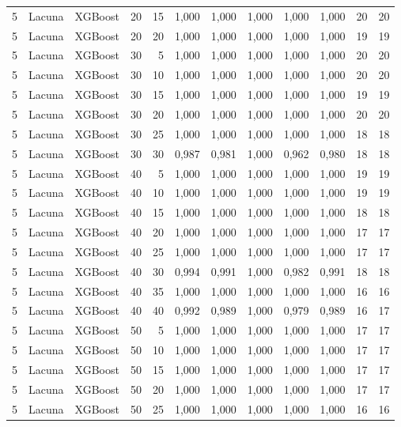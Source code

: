 \begin{longtable}{@{}rllrrrrrrrrr@{}}
5 & Lacuna & XGBoost & 20 & 15 & 1,000 & 1,000 & 1,000 & 1,000 & 1,000 & 20 & 20 \\
5 & Lacuna & XGBoost & 20 & 20 & 1,000 & 1,000 & 1,000 & 1,000 & 1,000 & 19 & 19 \\
5 & Lacuna & XGBoost & 30 & 5 & 1,000 & 1,000 & 1,000 & 1,000 & 1,000 & 20 & 20 \\
5 & Lacuna & XGBoost & 30 & 10 & 1,000 & 1,000 & 1,000 & 1,000 & 1,000 & 20 & 20 \\
5 & Lacuna & XGBoost & 30 & 15 & 1,000 & 1,000 & 1,000 & 1,000 & 1,000 & 19 & 19 \\
5 & Lacuna & XGBoost & 30 & 20 & 1,000 & 1,000 & 1,000 & 1,000 & 1,000 & 20 & 20 \\
5 & Lacuna & XGBoost & 30 & 25 & 1,000 & 1,000 & 1,000 & 1,000 & 1,000 & 18 & 18 \\
5 & Lacuna & XGBoost & 30 & 30 & 0,987 & 0,981 & 1,000 & 0,962 & 0,980 & 18 & 18 \\
5 & Lacuna & XGBoost & 40 & 5 & 1,000 & 1,000 & 1,000 & 1,000 & 1,000 & 19 & 19 \\
5 & Lacuna & XGBoost & 40 & 10 & 1,000 & 1,000 & 1,000 & 1,000 & 1,000 & 19 & 19 \\
5 & Lacuna & XGBoost & 40 & 15 & 1,000 & 1,000 & 1,000 & 1,000 & 1,000 & 18 & 18 \\
5 & Lacuna & XGBoost & 40 & 20 & 1,000 & 1,000 & 1,000 & 1,000 & 1,000 & 17 & 17 \\
5 & Lacuna & XGBoost & 40 & 25 & 1,000 & 1,000 & 1,000 & 1,000 & 1,000 & 17 & 17 \\
5 & Lacuna & XGBoost & 40 & 30 & 0,994 & 0,991 & 1,000 & 0,982 & 0,991 & 18 & 18 \\
5 & Lacuna & XGBoost & 40 & 35 & 1,000 & 1,000 & 1,000 & 1,000 & 1,000 & 16 & 16 \\
5 & Lacuna & XGBoost & 40 & 40 & 0,992 & 0,989 & 1,000 & 0,979 & 0,989 & 16 & 17 \\
5 & Lacuna & XGBoost & 50 & 5 & 1,000 & 1,000 & 1,000 & 1,000 & 1,000 & 17 & 17 \\
5 & Lacuna & XGBoost & 50 & 10 & 1,000 & 1,000 & 1,000 & 1,000 & 1,000 & 17 & 17 \\
5 & Lacuna & XGBoost & 50 & 15 & 1,000 & 1,000 & 1,000 & 1,000 & 1,000 & 17 & 17 \\
5 & Lacuna & XGBoost & 50 & 20 & 1,000 & 1,000 & 1,000 & 1,000 & 1,000 & 17 & 17 \\
5 & Lacuna & XGBoost & 50 & 25 & 1,000 & 1,000 & 1,000 & 1,000 & 1,000 & 16 & 16 \\

\end{longtable}
